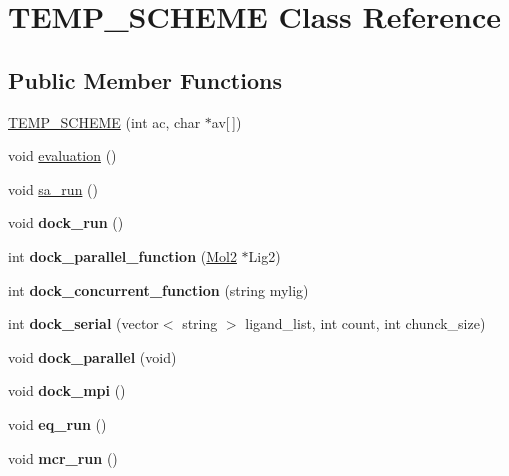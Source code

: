 \hypertarget{classTEMP__SCHEME}{
\section{TEMP\_\-SCHEME Class Reference}
\label{classTEMP__SCHEME}
}
\subsection*{Public Member Functions}
\begin{DoxyCompactItemize}
\item 
\hyperlink{classTEMP__SCHEME_abfda658a31fbb1178afd3c10f3ed21a2}{TEMP\_\-SCHEME} (int ac, char $\ast$av\mbox{[}$\,$\mbox{]})
\item 
void \hyperlink{classTEMP__SCHEME_a256532c5ca880e747c22080619833a11}{evaluation} ()
\item 
void \hyperlink{classTEMP__SCHEME_aba6ebed5456be151206d71a7e2e35745}{sa\_\-run} ()
\item 
\hypertarget{classTEMP__SCHEME_ab4c26bb0baf0421e5bc5ff87eec4bfd9}{
void {\bfseries dock\_\-run} ()}
\label{classTEMP__SCHEME_ab4c26bb0baf0421e5bc5ff87eec4bfd9}

\item 
\hypertarget{classTEMP__SCHEME_acb06d74e13ad76e5fa1ee6376d9e4e96}{
int {\bfseries dock\_\-parallel\_\-function} (\hyperlink{classMol2}{Mol2} $\ast$Lig2)}
\label{classTEMP__SCHEME_acb06d74e13ad76e5fa1ee6376d9e4e96}

\item 
\hypertarget{classTEMP__SCHEME_ae7f1bbdd68e5cc47ea558a73bfb168dc}{
int {\bfseries dock\_\-concurrent\_\-function} (string mylig)}
\label{classTEMP__SCHEME_ae7f1bbdd68e5cc47ea558a73bfb168dc}

\item 
\hypertarget{classTEMP__SCHEME_a8610aaccfa6268c3b097d2d676793cfe}{
int {\bfseries dock\_\-serial} (vector$<$ string $>$ ligand\_\-list, int count, int chunck\_\-size)}
\label{classTEMP__SCHEME_a8610aaccfa6268c3b097d2d676793cfe}

\item 
\hypertarget{classTEMP__SCHEME_a6933d56e026f7ea3e9297fd2a75447d9}{
void {\bfseries dock\_\-parallel} (void)}
\label{classTEMP__SCHEME_a6933d56e026f7ea3e9297fd2a75447d9}

\item 
\hypertarget{classTEMP__SCHEME_a0e05350cced615d231ba102b5989b77c}{
void {\bfseries dock\_\-mpi} ()}
\label{classTEMP__SCHEME_a0e05350cced615d231ba102b5989b77c}

\item 
\hypertarget{classTEMP__SCHEME_a38687634fd166bdbab1e8e1d4ce9640a}{
void {\bfseries eq\_\-run} ()}
\label{classTEMP__SCHEME_a38687634fd166bdbab1e8e1d4ce9640a}

\item 
\hypertarget{classTEMP__SCHEME_af83c379cefff27d713fc0b5b0ca50916}{
void {\bfseries mcr\_\-run} ()}
\label{classTEMP__SCHEME_af83c379cefff27d713fc0b5b0ca50916}

\end{DoxyCompactItemize}
